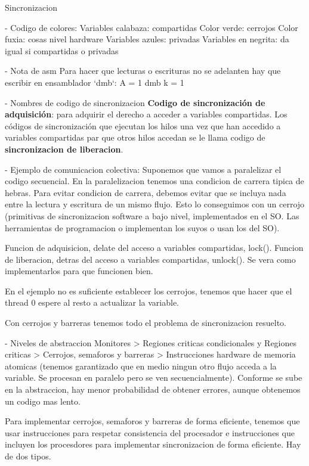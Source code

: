 Sincronizacion

- Codigo de colores:
Variables calabaza: compartidas
Color verde: cerrojos
Color fuxia: cosas nivel hardware
Variables azules: privadas
Variables en negrita: da igual si compartidas o privadas

- Nota de asm
Para hacer que lecturas o escrituras no se adelanten hay que escribir en ensamblador `dmb`:
A = 1
dmb 
k = 1

- Nombres de codigo de sincronizacion
\textbf{Codigo de sincronización de adquisición}: para adquirir el derecho a acceder a variables compartidas.
Los códigos de sincronización que ejecutan los hilos una vez que han accedido a variables compartidas par que otros hilos accedan se le llama codigo de \textbf{sincronizacion de liberacion}.

- Ejemplo de comunicacion colectiva:
Suponemos que vamos a paralelizar el codigo secuencial. En la paralelizacion tenemos una condicion de carrera tipica de hebras.
Para evitar condicion de carrera, debemos evitar que se incluya nada entre la lectura y escritura de un mismo flujo. Esto lo conseguimos con un cerrojo (primitivas de sincronizacion software a bajo nivel, implementados en el SO. Las herramientas de programacion o implementan los suyos o usan los del SO).

Funcion de adquisicion, delate del acceso a variables compartidas, lock().
Funcion de liberacion, detras del acceso a variables compartidas, unlock().
Se vera como implementarlos para que funcionen bien.

En el ejemplo no es suficiente establecer los cerrojos, tenemos que hacer que el thread 0 espere al resto a actualizar la variable.

Con cerrojos y barreras tenemos todo el problema de sincronizacion resuelto.

- Niveles de abstraccion
Monitores > Regiones criticas condicionales y Regiones criticas > Cerrojos, semaforos y barreras > Instrucciones hardware de memoria atomicas (tenemos garantizado que en medio ningun otro flujo acceda a la variable. Se procesan en paralelo pero se ven secuencialmente).
Conforme se sube en la abstraccion, hay menor probabilidad de obtener errores, aunque obtenemos un codigo mas lento.

Para implementar cerrojos, semaforos y barreras de forma eficiente, tenemos que usar instrucciones para respetar consistencia del procesador e instrucciones que incluyen los procesdores para implementar sincronizacion de forma eficiente. Hay de dos tipos.




